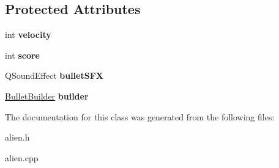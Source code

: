 \subsection*{Protected Attributes}
\begin{DoxyCompactItemize}
\item 
\mbox{\label{classgame_1_1Alien_a27481624e87c97c483ef69ddbb425d59}} 
int {\bfseries velocity}
\item 
\mbox{\label{classgame_1_1Alien_a092e336e9db2ad02fd1fa29c6f6812a4}} 
int {\bfseries score}
\item 
\mbox{\label{classgame_1_1Alien_a3411d1a2a4c2c7c5141e2ab02a5bff2d}} 
Q\+Sound\+Effect {\bfseries bullet\+S\+FX}
\item 
\mbox{\label{classgame_1_1Alien_a60c64a2c8b598ba3f4981f883cd1a02a}} 
\hyperlink{classgame_1_1BulletBuilder}{Bullet\+Builder} {\bfseries builder}
\end{DoxyCompactItemize}


The documentation for this class was generated from the following files\+:\begin{DoxyCompactItemize}
\item 
alien.\+h\item 
alien.\+cpp\end{DoxyCompactItemize}
